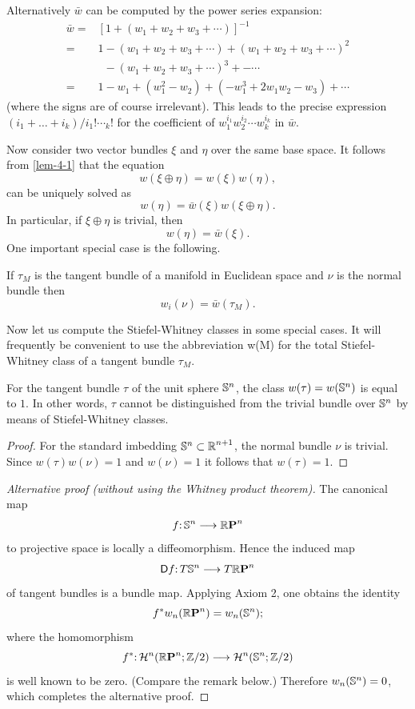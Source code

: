 Alternatively $\bar{w}$ can be computed by the power series expansion:
\begin{align*}
	\bar{w}=&\left[1+\left(w_{1}+w_{2}+w_{3}+\cdots\right)\right]^{-1} \\
	=& 1-\left(w_{1}+w_{2}+w_{3}+\cdots\right)+\left(w_{1}+w_{2}+w_{3}+\cdots\right)^{2} \\
	&\phantom{1} -\left(w_{1}+w_{2}+w_{3}+\cdots\right)^{3}+-\cdots \\
	=& 1-w_{1}+\left(w_{1}^{2}-w_{2}\right)+\left(-w_{1}^{3}+2 w_{1} w_{2}-w_{3}\right)+\cdots
\end{align*}
(where the signs are of course irrelevant). This leads to the precise expression $(i_1+\dots+i_k)/i_1!\dotsi_k!$ for the coefficient of $w_{1}^{i_{1}} w_{2}^{i_{2}} \cdots w_{k}^{i_{k}}$ in $\bar{w}$.

Now consider two vector bundles $\xi$ and $\eta$ over the same base space.
It follows from \cref{lem-4-1} that the equation
\[w(\xi \oplus \eta)=w(\xi) w(\eta),\]
can be uniquely solved as
\[w(\eta)=\bar{w}(\xi) w(\xi \oplus \eta).\]
In particular, if $\xi \oplus \eta$ is trivial, then
\[w(\eta)=\bar{w}(\xi).\]
One important special case is the following.
\begin{lemma}\label{lem-4-2}
	If $\tau_M$ is the tangent
	bundle of a manifold in Euclidean space and $\nu$ is the normal
	bundle then
	\[w_i(\nu)=\bar{w}(\tau_M).\]
\end{lemma}
Now let us compute the Stiefel-Whitney classes in some special cases.
It will frequently be convenient to use the abbreviation w(M) for the total
Stiefel-Whitney class of a tangent bundle $\tau_M$.

\begin{example}\label{ex-4-1}
	For the tangent bundle $\tau$ of the unit sphere $\mathbb{S}^{n}$, the class
	$w(\tau) =w(\mathbb{S}^{n})$ is equal to $1$. In other words, $\tau$ cannot be distinguished
	from the trivial bundle over $\mathbb{S}^{n}$ by means of Stiefel-Whitney classes.
	\begin{proof}
		For the standard imbedding $\mathbb{S}^{n}\subset\boldsymbol{\mathbb{R}}^{n+1}$, the normal bundle $\nu$
		is trivial. Since $w(\tau)w(\nu) = 1$ and $w(\nu) = 1$ it follows that $w(\tau) = 1$.
	\end{proof}
\begin{proof}[Alternative proof (without using the Whitney product theorem)] The
	canonical map
	\[\map{f}{\Sphere{n}}{\rp{n}}\]
	to projective space is locally a diffeomorphism. Hence the induced map
		\[\map{\mathsf{D}f}{T\Sphere{n}}{T\rp{n}}\]
		of tangent bundles is a bundle map. Applying Axiom 2, one obtains the
		identity
		\[f^*w_n(\boldsymbol{\mathbb{R}}\boldsymbol{\mathrm{P}}^{n})=w_n(\mathbb{S}^{n});\]
		where the homomorphism
		\[\map{f^*}{\homology^n(\rp{n};\Z/2)}{\homology^n(\Sphere{n};\Z/2)}\]
		is well known to be zero. (Compare the remark below.) Therefore
		$w_n(\mathbb{S}^{n}) =0$, which completes the alternative proof. 
\end{proof}
\end{example}

